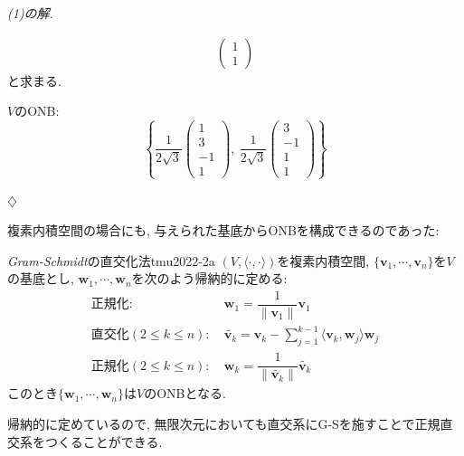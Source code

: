 \documentclass[titlepage]{jsarticle}
\numberwithin{equation}{section}
\newenvironment{kaitou}[1][解]{%
\begin{proofbox}%
\textit{#1. }\ignorespaces
}{%
\hfill$\diamondsuit$%
\end{proofbox}%
}
\begin{document}
\begin{kaitou}[(1)の解]
\begin{align*}
\begin{pmatrix}
1\\
1
\end{pmatrix}
\end{align*}
と求まる.
\begin{answerbox}
$V$のONB: 
\[
\left\{
\dfrac{1}{2\sqrt{3}}
\begin{pmatrix}
1\\
3\\
-1\\
1
\end{pmatrix}
,\:
\dfrac{1}{2\sqrt{3}}
\begin{pmatrix}
3\\
-1\\
1\\
1
\end{pmatrix}
\right\}
\]
\end{answerbox}
\end{kaitou}
複素内積空間の場合にも, 与えられた基底からONBを構成できるのであった:
\begin{thm}{\textit{Gram-Schmidt}の直交化法}{tmu2022-2a}
$\left(V, \langle \cdot, \cdot\rangle\right)$を複素内積空間, $\{\bm{v}_1, \cdots, \bm{v}_n\}$を$V$の基底とし, $\bm{w}_1, \cdots, \bm{w}_n$を次のよう帰納的に定める:
\begin{align*}
\text{正規化}:\:&\bm{w}_1 = \dfrac{1}{\|\bm{v}_1\|}\bm{v}_1\\
\text{直交化}(2 \le k \le n):\: &\tilde{\bm{v}_k} = \bm{v}_k - \sum_{j = 1}^{k-1} \langle \bm{v}_k, \bm{w}_j \rangle \bm{w}_j\\
\text{正規化}(2 \le k \le n): \:&\bm{w}_k = \dfrac{1}{\|\tilde{\bm{v}_k}\|}\tilde{\bm{v}_k}
\end{align*}
このとき$\{\bm{w}_1, \cdots, \bm{w}_n\}$は$V$のONBとなる.
\end{thm}
\begin{marker}
帰納的に定めているので, 無限次元においても直交系にG-Sを施すことで正規直交系をつくることができる.
\end{marker}
\end{document}

